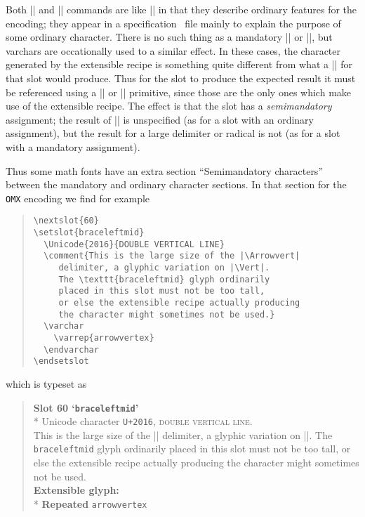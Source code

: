\documentclass[a4paper]{article}
\DeclareRobustCommand\ETX{\textsmaller{ETX}}
\begin{document}
Both |\nextlarger| and |\varchar| commands are like |\ligature| in 
that they describe ordinary features for the encoding; they appear in 
a specification \ETX\ file mainly to explain the purpose of some 
ordinary character. There is no such thing as a mandatory |\nextlarger| 
or |\varchar|, but varchars are occationally used to a similar effect. 
In these cases, the character generated by the extensible recipe is 
something quite different from what a |\char| for that slot would 
produce. Thus for the slot to produce the expected result it must be 
referenced using a |\delimiter| or |\radical| primitive, since those 
are the only ones which make use of the extensible recipe. The effect 
is that the slot has a \emph{semimandatory} assignment; the result of 
|\char| is unspecified (as for a slot with an ordinary assignment), but 
the result for a large delimiter or radical is not (as for a slot with 
a mandatory assignment). 

Thus some math fonts have an extra section ``Semimandatory characters'' 
between the mandatory and ordinary character sections. In that section 
for the \texttt{OMX} encoding we find for example 
\begin{quote}\begin{verbatim}
\nextslot{60}
\setslot{braceleftmid}
  \Unicode{2016}{DOUBLE VERTICAL LINE}
  \comment{This is the large size of the |\Arrowvert| 
     delimiter, a glyphic variation on |\Vert|. 
     The \texttt{braceleftmid} glyph ordinarily 
     placed in this slot must not be too tall, 
     or else the extensible recipe actually producing 
     the character might sometimes not be used.}
  \varchar
    \varrep{arrowvertex}
  \endvarchar
\endsetslot
\end{verbatim}\end{quote}
which is typeset as
\begin{quote}
  \textbf{Slot 60 `\texttt{braceleftmid}'}\\*
  Unicode character \texttt{U+2016}, \textsc{double vertical line}.\\
  This is the large size of the |\Arrowvert| 
  delimiter, a glyphic variation on |\Vert|. 
  The \texttt{braceleftmid} glyph ordinarily 
  placed in this slot must not be too tall, 
  or else the extensible recipe actually producing 
  the character might sometimes not be used.\\
  \textbf{Extensible glyph:}\\*
  \textbf{Repeated} \texttt{arrowvertex}
\end{quote}
\end{document}
